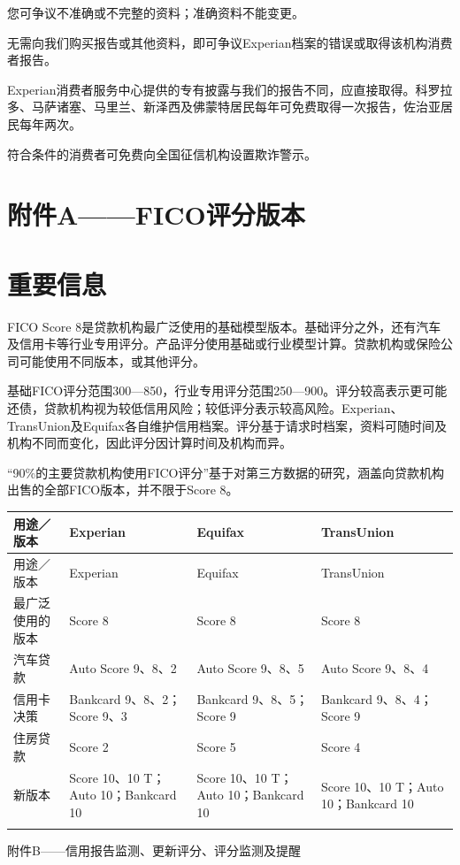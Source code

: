 \documentclass[UTF8,fontset=none,11pt,a4paper]{ctexart}
\begin{document}
您可争议不准确或不完整的资料；准确资料不能变更。


无需向我们购买报告或其他资料，即可争议Experian档案的错误或取得该机构消费者报告。


Experian消费者服务中心提供的专有披露与我们的报告不同，应直接取得。科罗拉多、马萨诸塞、马里兰、新泽西及佛蒙特居民每年可免费取得一次报告，佐治亚居民每年两次。


符合条件的消费者可免费向全国征信机构设置欺诈警示。


\section*{附件A——FICO评分版本}
\section*{重要信息}
FICO Score 8是贷款机构最广泛使用的基础模型版本。基础评分之外，还有汽车及信用卡等行业专用评分。产品评分使用基础或行业模型计算。贷款机构或保险公司可能使用不同版本，或其他评分。


基础FICO评分范围300—850，行业专用评分范围250—900。评分较高表示更可能还债，贷款机构视为较低信用风险；较低评分表示较高风险。Experian、TransUnion及Equifax各自维护信用档案。评分基于请求时档案，资料可随时间及机构不同而变化，因此评分因计算时间及机构而异。


“90\%的主要贷款机构使用FICO评分”基于对第三方数据的研究，涵盖向贷款机构出售的全部FICO版本，并不限于Score 8。


\begingroup\small\setlength{\tabcolsep}{4pt}\renewcommand{\arraystretch}{1.35}
\begin{longtable}{>{\raggedright\arraybackslash}p{0.26\dimexpr\linewidth-8\tabcolsep\relax}>{\raggedright\arraybackslash}p{0.14\dimexpr\linewidth-8\tabcolsep\relax}>{\raggedright\arraybackslash}p{0.27\dimexpr\linewidth-8\tabcolsep\relax}>{\raggedright\arraybackslash}p{0.33\dimexpr\linewidth-8\tabcolsep\relax}}
\toprule
\rowcolor{TableHead} 用途／版本 & Experian & Equifax & TransUnion \\
\midrule\endfirsthead
\toprule
\rowcolor{TableHead} 用途／版本 & Experian & Equifax & TransUnion \\
\midrule\endhead
\midrule\endfoot
\bottomrule\endlastfoot
最广泛使用的版本 & Score 8 & Score 8 & Score 8 \\ \addlinespace[3pt]
汽车贷款 & Auto Score 9、8、2 & Auto Score 9、8、5 & Auto Score 9、8、4 \\ \addlinespace[3pt]
信用卡决策 & Bankcard 9、8、2；Score 9、3 & Bankcard 9、8、5；Score 9 & Bankcard 9、8、4；Score 9 \\ \addlinespace[3pt]
住房贷款 & Score 2 & Score 5 & Score 4 \\ \addlinespace[3pt]
新版本 & Score 10、10 T；Auto 10；Bankcard 10 & Score 10、10 T；Auto 10；Bankcard 10 & Score 10、10 T；Auto 10；Bankcard 10 \\ \addlinespace[3pt]
\end{longtable}\endgroup
附件B——信用报告监测、更新评分、评分监测及提醒
\end{document}
